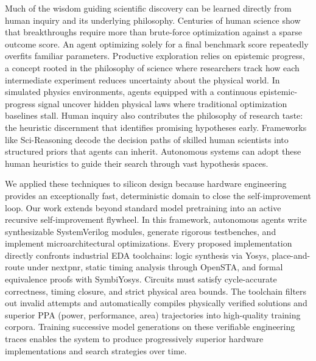 Much of the wisdom guiding scientific discovery can be learned directly from human inquiry and its underlying philosophy. Centuries of human science show that breakthroughs require more than brute-force optimization against a sparse outcome score. An agent optimizing solely for a final benchmark score repeatedly overfits familiar parameters. Productive exploration relies on epistemic progress, a concept rooted in the philosophy of science where researchers track how each intermediate experiment reduces uncertainty about the physical world. In simulated physics environments, agents equipped with a continuous epistemic-progress signal uncover hidden physical laws where traditional optimization baselines stall. Human inquiry also contributes the philosophy of research taste: the heuristic discernment that identifies promising hypotheses early. Frameworks like Sci-Reasoning decode the decision paths of skilled human scientists into structured priors that agents can inherit. Autonomous systems can adopt these human heuristics to guide their search through vast hypothesis spaces.

We applied these techniques to silicon design because hardware engineering provides an exceptionally fast, deterministic domain to close the self-improvement loop. Our work extends beyond standard model pretraining into an active recursive self-improvement flywheel. In this framework, autonomous agents write synthesizable SystemVerilog modules, generate rigorous testbenches, and implement microarchitectural optimizations. Every proposed implementation directly confronts industrial EDA toolchains: logic synthesis via Yosys, place-and-route under nextpnr, static timing analysis through OpenSTA, and formal equivalence proofs with SymbiYosys. Circuits must satisfy cycle-accurate correctness, timing closure, and strict physical area bounds. The toolchain filters out invalid attempts and automatically compiles physically verified solutions and superior PPA (power, performance, area) trajectories into high-quality training corpora. Training successive model generations on these verifiable engineering traces enables the system to produce progressively superior hardware implementations and search strategies over time.


